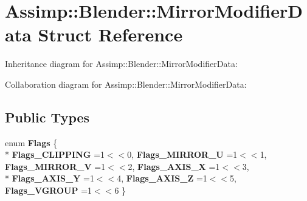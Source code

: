 \hypertarget{struct_assimp_1_1_blender_1_1_mirror_modifier_data}{\section{Assimp\+:\+:Blender\+:\+:Mirror\+Modifier\+Data Struct Reference}
\label{struct_assimp_1_1_blender_1_1_mirror_modifier_data}
}


Inheritance diagram for Assimp\+:\+:Blender\+:\+:Mirror\+Modifier\+Data\+:


Collaboration diagram for Assimp\+:\+:Blender\+:\+:Mirror\+Modifier\+Data\+:
\subsection*{Public Types}
\begin{DoxyCompactItemize}
\item 
\hypertarget{struct_assimp_1_1_blender_1_1_mirror_modifier_data_a2ee0369df57be5e342e3b9c2a9c492b6}{enum {\bfseries Flags} \{ \\*
{\bfseries Flags\+\_\+\+C\+L\+I\+P\+P\+I\+N\+G} =1$<$$<$0, 
{\bfseries Flags\+\_\+\+M\+I\+R\+R\+O\+R\+\_\+\+U} =1$<$$<$1, 
{\bfseries Flags\+\_\+\+M\+I\+R\+R\+O\+R\+\_\+\+V} =1$<$$<$2, 
{\bfseries Flags\+\_\+\+A\+X\+I\+S\+\_\+\+X} =1$<$$<$3, 
\\*
{\bfseries Flags\+\_\+\+A\+X\+I\+S\+\_\+\+Y} =1$<$$<$4, 
{\bfseries Flags\+\_\+\+A\+X\+I\+S\+\_\+\+Z} =1$<$$<$5, 
{\bfseries Flags\+\_\+\+V\+G\+R\+O\+U\+P} =1$<$$<$6
 \}}\label{struct_assimp_1_1_blender_1_1_mirror_modifier_data_a2ee0369df57be5e342e3b9c2a9c492b6}

\end{DoxyCompactItemize}
